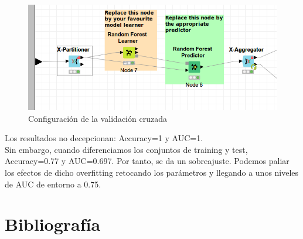  \begin{figure}[H] %
 	\centering
 	\includegraphics[scale=0.4453]{exp1.png}  %
 	\caption{Configuración de la validación cruzada} 
 	\label{fig:exp}
 \end{figure}

Los resultados no decepcionan: Accuracy=1 y AUC=1. \\

Sin embargo, cuando diferenciamos los conjuntos de training y test, Accuracy=0.77 y AUC=0.697. Por tanto, se da un sobreajuste. Podemos paliar los efectos de dicho overfitting retocando los parámetros y llegando a unos niveles de AUC de entorno a 0.75.

\newpage
\section{Bibliografía}




